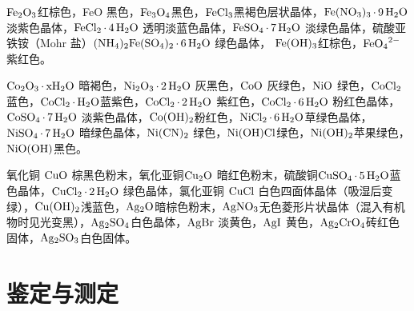 \documentclass[
  10pt,
  twoside,
  openany,
  b5paper, %
  colorscheme = basic, %
  xits = false,
]{qyxf-book}
\begin{document}
$\ce{Fe2O3}$红棕色，FeO 黑色，$\ce{Fe3O4}$黑色，$\ce{FeCl3}$黑褐色层状晶体，$\ce{Fe(NO3)3*9H2O}$淡紫色晶体，$\ce{FeCl2*4H2O}$
透明淡蓝色晶体，$\ce{FeSO4*7H2O}$ 淡绿色晶体，硫酸亚铁铵（Mohr 盐）$\ce{(NH4)2Fe(SO4)2*6H2O}$ 绿色晶体，
$\ce{Fe(OH)3}$红棕色，$\ce{FeO4^2-}$紫红色。

$\ce{Co2O3*xH2O}$ 暗褐色，$\ce{Ni2O3*2H2O}$ 灰黑色，$\ce{CoO}$ 灰绿色，$\ce{NiO}$ 绿色，$\ce{CoCl2}$蓝色，$\ce{CoCl2*H2O}$蓝紫色，$\ce{CoCl2*2H2O}$ 紫红色，$\ce{CoCl2*6H2O}$ 粉红色晶体，$\ce{CoSO4*7H2O}$ 淡紫色晶体，$\ce{Co(OH)2}$粉红色，$\ce{NiCl2*6H2O}$草绿色晶体，$\ce{NiSO4*7H2O}$ 暗绿色晶体，$\ce{Ni(CN)2}$ 绿色，$\ce{Ni(OH)Cl}$绿色，$\ce{Ni(OH)2}$苹果绿色，$\ce{NiO(OH)}$黑色。

氧化铜 $\ce{CuO}$ 棕黑色粉末，氧化亚铜$ \ce{Cu2O}$ 暗红色粉末，硫酸铜$\ce{CuSO4*5H2O} $蓝色晶体，$\ce{CuCl2*2H2O}$ 绿色晶体，氯化亚铜 $\ce{CuCl}$ 白色四面体晶体（吸湿后变绿），$\ce{Cu(OH)2}$浅蓝色，$\ce{Ag2O}$暗棕色粉末，$\ce{AgNO3}$无色菱形片状晶体（混入有机物时见光变黑），$\ce{Ag2SO4}$白色晶体，$\ce{AgBr}$ 淡黄色，$\ce{AgI}$ 黄色，$\ce{Ag2CrO4}$砖红色固体，$\ce{Ag2SO3}$白色固体。

\newpage

\section{鉴定与测定}
\end{document}
